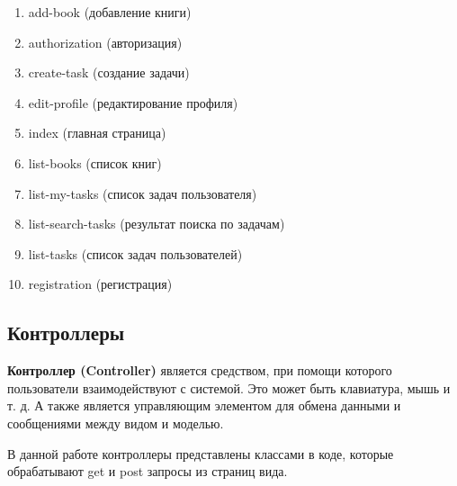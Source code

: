 \begin{enumerate}
\item add-book (добавление книги)
\item authorization (авторизация)
\item create-task (создание задачи)
\item edit-profile (редактирование профиля)
\item index (главная страница)
\item list-books (список книг)
\item list-my-tasks (список задач пользователя)
\item list-search-tasks (результат поиска по задачам)
\item list-tasks (список задач пользователей)
\item registration (регистрация)
\end{enumerate}

\subsection{Контроллеры}

\textbf{Контроллер (Controller)} является средством, при помощи которого пользователи взаимодействуют с системой. Это может быть клавиатура, мышь и т. д. А также является управляющим элементом для обмена данными и сообщениями между видом и моделью.

В данной работе контроллеры представлены классами в коде, которые обрабатывают get и post запросы из страниц вида.


